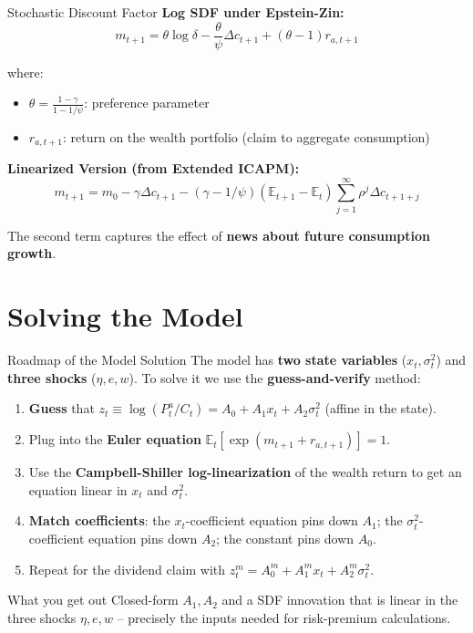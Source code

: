 \documentclass{beamer}
\newcommand{\E}{\mathbb{E}}
\begin{document}
\begin{frame}{Stochastic Discount Factor}
    \textbf{Log SDF under Epstein-Zin:}
    \begin{equation}
        m_{t+1} = \theta \log \delta - \frac{\theta}{\psi} \Delta c_{t+1} + (\theta - 1) r_{a,t+1}
    \end{equation}
    
    where:
    \begin{itemize}
        \item $\theta = \frac{1-\gamma}{1-1/\psi}$: preference parameter
        \item $r_{a,t+1}$: return on the wealth portfolio (claim to aggregate consumption)
    \end{itemize}
    
    \vspace{0.3cm}
    \textbf{Linearized Version (from Extended ICAPM):}
    \begin{equation}
        m_{t+1} = m_0 - \gamma \Delta c_{t+1} - (\gamma - 1/\psi)(\E_{t+1} - \E_t) \sum_{j=1}^{\infty} \rho^j \Delta c_{t+1+j}
    \end{equation}
    
    The second term captures the effect of \textbf{news about future consumption growth}.
\end{frame}

\section{Solving the Model}

\begin{frame}{Roadmap of the Model Solution}
	The model has \textbf{two state variables} ($x_t,\sigma_t^2$) and \textbf{three shocks} ($\eta,e,w$). To solve it we use the \textbf{guess-and-verify} method:
	\vspace{4pt}
	\begin{enumerate}
		\item \textbf{Guess} that $z_t \equiv \log(P_t^a/C_t) = A_0 + A_1 x_t + A_2 \sigma_t^2$ (affine in the state).
		\item Plug into the \textbf{Euler equation} $\E_t[\exp(m_{t+1}+r_{a,t+1})] = 1$.
		\item Use the \textbf{Campbell-Shiller log-linearization} of the wealth return to get an equation linear in $x_t$ and $\sigma_t^2$.
		\item \textbf{Match coefficients}: the $x_t$-coefficient equation pins down $A_1$; the $\sigma_t^2$-coefficient equation pins down $A_2$; the constant pins down $A_0$.
		\item Repeat for the dividend claim with $z_t^m = A_0^m + A_1^m x_t + A_2^m \sigma_t^2$.
	\end{enumerate}
	\vspace{4pt}
	\begin{block}{What you get out}
		Closed-form $A_1, A_2$ and a SDF innovation that is linear in the three shocks $\eta,e,w$ -- precisely the inputs needed for risk-premium calculations.
	\end{block}
\end{frame}
\end{document}
